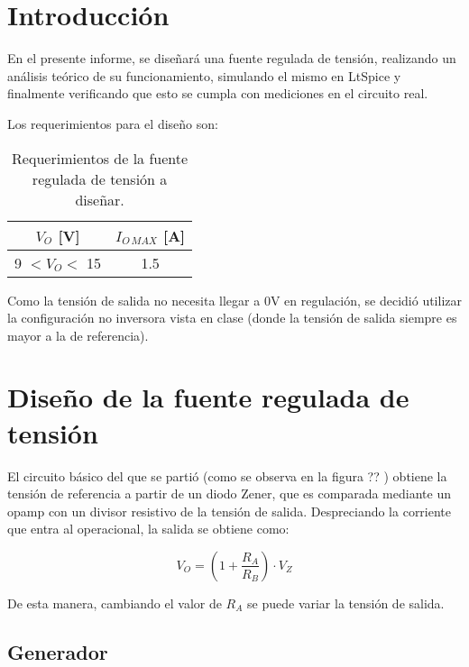 \documentclass[e2_tp1_main.tex]{subfiles}
\begin{document}
\section{Introducci\'on}

En el presente informe, se dise\~nar\'a una fuente regulada de tensi\'on, realizando un an\'alisis te\'orico de su funcionamiento, simulando el mismo en LtSpice y finalmente verificando que esto se cumpla con mediciones en el circuito real. 

Los requerimientos para el dise\~no son:
\begin{table}[ht!]
	\centering
	
	\begin{tabular}{|c|c|}
		\hline 
		$V_{O}$ [V] & $I_{O\, MAX}$ [A] \\ 
		\hline \hline
		9 $< V_O <$ 15 & 1.5 \\ 
		\hline 
		\end{tabular} 	
	
	\caption{Requerimientos de la fuente regulada de tensi\'on a dise\~nar.}
	\label{table:reqs}
\end{table}

Como la tensi\'on de salida no necesita llegar a 0V en regulaci\'on, se decidi\'o utilizar la configuraci\'on no inversora vista en clase (donde la tensi\'on de salida siempre es mayor a la de referencia).


\section{Dise\~no de la fuente regulada de tensi\'on}

El circuito b\'asico del que se parti\'o (como se observa en la figura ?? ) obtiene la tensi\'on de referencia a partir de un diodo Zener, que es comparada mediante un opamp con un divisor resistivo de la tensi\'on de salida. Despreciando la corriente que entra al operacional, la salida se obtiene como:

\begin{equation}
	V_{O} = \left( 1+\frac{R_A}{R_B} \right) \cdot V_Z
\end{equation}

De esta manera, cambiando el valor de $R_A$ se puede variar la tensi\'on de salida. 


\subsection{Generador}
\end{document}

